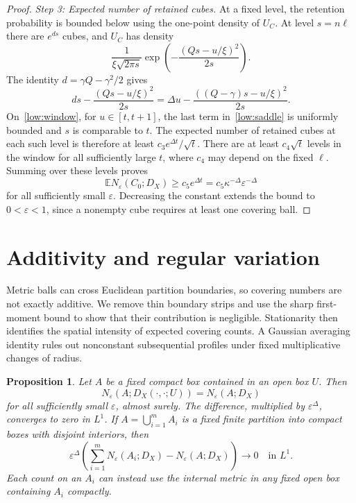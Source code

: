 \documentclass[11pt,letterpaper]{article}
\newcommand{\E}{\mathbb E}
\newcommand{\eps}{\varepsilon}
\newtheorem{proposition}[theorem]{Proposition}
\theoremstyle{definition}
\theoremstyle{remark}
\numberwithin{equation}{section}
\begin{document}
\begin{proof}
\emph{Step 3: Expected number of retained cubes.}
At a fixed level, the retention probability is bounded below using the one-point density of $U_C$. At level $s=n\ell$ there are $e^{ds}$ cubes, and $U_C$ has density
\begin{equation*}
 \frac{1}{\xi\sqrt{2\pi s}}
       \exp\left(-\frac{(Qs-u/\xi)^2}{2s}\right).
\end{equation*}
The identity $d=\gamma Q-\gamma^2/2$ gives
\begin{equation}\label{low:saddle}
 ds-\frac{(Qs-u/\xi)^2}{2s}
   =\Delta u-
      \frac{((Q-\gamma)s-u/\xi)^2}{2s}.
\end{equation}
On~\eqref{low:window}, for $u\in[t,t+1]$, the last term in~\eqref{low:saddle} is uniformly bounded and $s$ is comparable to $t$. The expected number of retained cubes at each such level is therefore at least $c_3e^{\Delta t}/\sqrt t$. There are at least $c_4\sqrt t$ levels in the window for all sufficiently large $t$, where $c_4$ may depend on the fixed $\ell$. Summing over these levels proves
\begin{equation*}
    \E N_\eps(C_0;D_X)
       \ge c_5e^{\Delta t}
       =c_5\kappa^{-\Delta}\eps^{-\Delta}
\end{equation*}
for all sufficiently small $\eps$. Decreasing the constant extends the bound to $0<\eps<1$, since a nonempty cube requires at least one covering ball.
\end{proof}

\section{Additivity and regular variation}

Metric balls can cross Euclidean partition boundaries, so covering numbers are not exactly additive. We remove thin boundary strips and use the sharp first-moment bound to show that their contribution is negligible. Stationarity then identifies the spatial intensity of expected covering counts. A Gaussian averaging identity rules out nonconstant subsequential profiles under fixed multiplicative changes of radius.

\begin{proposition}\label{prop:additivity}
Let $A$ be a fixed compact box contained in an open box $U$. Then
\begin{equation}\label{eq:local-cover-equality}
 N_\eps(A;D_X(\cdot,\cdot;U))=N_\eps(A;D_X)
\end{equation}
for all sufficiently small $\eps$, almost surely. The difference, multiplied by $\eps^\Delta$, converges to zero in $L^1$. If $A=\bigcup_{i=1}^m A_i$ is a fixed finite partition into compact boxes with disjoint interiors, then
\begin{equation}\label{eq:additivity}
 \eps^\Delta\left(\sum_{i=1}^m N_\eps(A_i;D_X)
                         -N_\eps(A;D_X)\right)\longrightarrow0
 \quad\text{in }L^1.
\end{equation}
Each count on an $A_i$ can instead use the internal metric in any fixed open box containing $A_i$ compactly.
\end{proposition}
\end{document}
